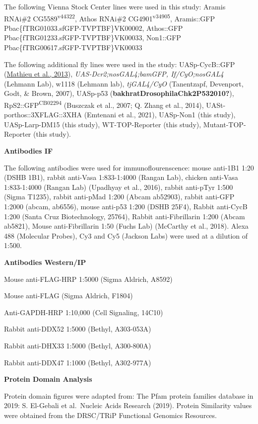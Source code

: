 \documentclass[12pt,oneside]{reedthesis}
\begin{document}
The following Vienna Stock Center lines were used in this study: Aramis RNAi\#2 CG5589\textsuperscript{v44322}, Athos RNAi\#2 CG4901\textsuperscript{v34905}, Aramis::GFP Pbac\{fTRG01033.sfGFP-TVPTBF\}VK00002, Athos::GFP Pbac\{fTRG01233.sfGFP-TVPTBF\}VK00033, Non1::GFP Pbac\{fTRG00617.sfGFP-TVPTBF\}VK00033

The following additional fly lines were used in the study: UASp-CycB::GFP (\href{https://www.ncbi.nlm.nih.gov/pmc/articles/PMC5830152/\#R25}{Mathieu et al., 2013}), \emph{UAS-Dcr2;nosGAL4;bamGFP, If/CyO;nosGAL4} (Lehmann Lab), w1118 (Lehmann lab), \emph{tjGAL4/CyO} (Tanentzapf, Devenport, Godt, \& Brown, 2007), UASp-p53 (\textbf{bakhratDrosophilaChk2P532010?}), RpS2::GFP\textsuperscript{CB02294} (Buszczak et al., 2007; Q. Zhang et al., 2014), UASt-porthos::3XFLAG::3XHA (Emtenani et al., 2021), UASp-Non1 (this study), UASp-Larp-DM15 (this study), WT-TOP-Reporter (this study), Mutant-TOP-Reporter (this study).

\textbf{Antibodies IF}

The following antibodies were used for immunoflourenscence: mouse anti-1B1 1:20 (DSHB 1B1), rabbit anti-Vasa 1:833-1:4000 (Rangan Lab), chicken anti-Vasa 1:833-1:4000 (Rangan Lab) (Upadhyay et al., 2016), rabbit anti-pTyr 1:500 (Sigma T1235), rabbit anti-pMad 1:200 (Abcam ab52903), rabbit anti-GFP 1:2000 (abcam, ab6556), mouse anti-p53 1:200 (DSHB 25F4), Rabbit anti-CycB 1:200 (Santa Cruz Biotechnology, 25764), Rabbit anti-Fibrillarin 1:200 (Abcam ab5821), Mouse anti-Fibrillarin 1:50 (Fuchs Lab) (McCarthy et al., 2018). Alexa 488 (Molecular Probes), Cy3 and Cy5 (Jackson Labs) were used at a dilution of 1:500.

\textbf{Antibodies Western/IP}

Mouse anti-FLAG-HRP 1:5000 (Sigma Aldrich, A8592)

Mouse anti-FLAG (Sigma Aldrich, F1804)

Anti-GAPDH-HRP 1:10,000 (Cell Signaling, 14C10)

Rabbit anti-DDX52 1:5000 (Bethyl, A303-053A)

Rabbit anti-DHX33 1:5000 (Bethyl, A300-800A)

Rabbit anti-DDX47 1:1000 (Bethyl, A302-977A)

\textbf{Protein Domain Analysis}

Protein domain figures were adapted from: The Pfam protein families database in 2019: S. El-Gebali et al.~Nucleic Acids Research (2019). Protein Similarity values were obtained from the DRSC/TRiP Functional Genomics Resources.
\end{document}
